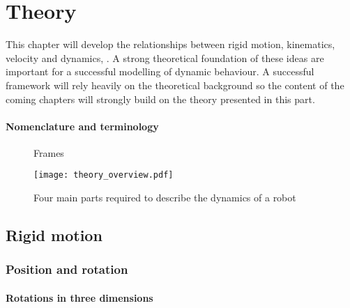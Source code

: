 \chapter{Theory}
This chapter will develop the relationships between rigid motion, kinematics, velocity and dynamics, . A strong theoretical foundation of these ideas are important for a successful modelling of dynamic behaviour. A successful framework will rely heavily on the theoretical background so the content of the coming chapters will strongly build on the theory presented in this part.

\subsubsection{Nomenclature and terminology}


\begin{figure}[h!]    
    \centering           
    \def\svgwidth{.8\columnwidth}
    
    \caption{Frames}
\end{figure}

\begin{figure}
 \centering 
 \texttt{[image: theory\_overview.pdf]}
 \caption{Four main parts required to describe the dynamics of a robot}
 \label{theory_overview}
\end{figure}

\section{Rigid motion}
\subsection{Position and rotation}
\subsubsection{Rotations in three dimensions}

